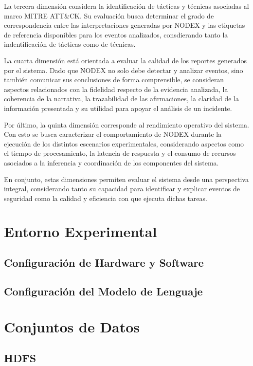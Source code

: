 La tercera dimensión considera la identificación de tácticas y técnicas asociadas al marco MITRE ATT&CK. Su evaluación busca determinar el grado de correspondencia entre las interpretaciones generadas por NODEX y las etiquetas de referencia disponibles para los eventos analizados, consdierando tanto la indentificación de tácticas como de técnicas.

La cuarta dimensión está orientada a evaluar la calidad de los reportes generados por el sistema. Dado que NODEX no solo debe detectar y analizar eventos, sino también comunicar sus conclusiones de forma comprensible, se consideran aspectos relacionados con la fidelidad respecto de la evidencia analizada, la coherencia de la narrativa, la trazabilidad de las afirmaciones, la claridad de la información presentada y su utilidad para apoyar el análisis de un incidente.

Por último, la quinta dimensión corresponde al rendimiento operativo del sistema. Con esto se busca caracterizar el comportamiento de NODEX durante la ejecución de los distintos escenarios experimentales, considerando aspectos como el tiempo de procesamiento, la latencia de respuesta y el consumo de recursos asociados a la inferencia y coordinación de los componentes del sistema.

En conjunto, estas dimensiones permiten evaluar el sistema desde una perspectiva integral, considerando tanto su capacidad para identificar y explicar eventos de seguridad como la calidad y eficiencia con que ejecuta dichas tareas.

\section{Entorno Experimental}

\subsection{Configuración de Hardware y Software}

\subsection{Configuración del Modelo de Lenguaje}

\section{Conjuntos de Datos}

\subsection{HDFS}


